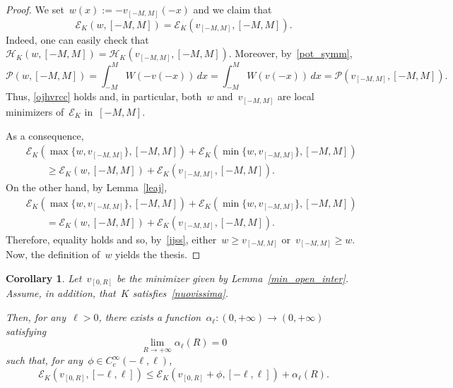 \documentclass[10pt,a4paper]{amsart}
\newtheorem{corol}[theorem]{Corollary}
\numberwithin{equation}{section}
\newcommand{\Ec}{\mathcal{E}_K}
\newcommand{\Hc}{\mathcal{H}_K}
\newcommand{\Pc}{\mathcal{P}}
\begin{document}
\begin{proof}
We set~$w(x):=-v_{[-M,M]}(-x)$ and we claim that
\begin{equation}\label{ojhvrcc}
\Ec(w,[-M,M]) = \Ec(v_{[-M,M]},[-M,M]).
\end{equation}
Indeed, one can easily check that~$\Hc(w,[-M,M])=\Hc(v_{[-M,M]},[-M,M])$.
Moreover, by~\eqref{pot_symm},
\begin{equation*}
\Pc(w,[-M,M])= \int_{-M}^{M} W(-v(-x))\, dx =\int_{-M}^{M} W(v(-x))\, dx =\Pc(v_{[-M,M]},[-M,M]).
\end{equation*}
Thus, \eqref{ojhvrcc} holds and, in particular, both~$w$ and~$v_{[-M,M]}$ are local minimizers of~$\Ec$ in~$[-M,M]$.

As a consequence,
\begin{eqnarray*}&&
\Ec(\max\{w,v_{[-M,M]}\},[-M,M])+\Ec(\min\{w,v_{[-M,M]}\},[-M,M])\\&&\qquad \geq \Ec(w,[-M,M]) +\Ec(v_{[-M,M]},[-M,M]).
\end{eqnarray*}
On the other hand, by Lemma~\ref{leaj},
\begin{eqnarray*}&&
\Ec(\max\{w,v_{[-M,M]}\},[-M,M])+\Ec(\min\{w,v_{[-M,M]}\},[-M,M]) \\&&\qquad= \Ec(w,[-M,M]) +\Ec(v_{[-M,M]},[-M,M]).
\end{eqnarray*}
Therefore, equality holds and so, by~\eqref{jjss},
either~$w \geq v_{[-M,M]}$ or~$v_{[-M,M]}\ge w$. Now, the definition of~$w$ yields the thesis.
\end{proof}

\begin{corol}\label{alm_min}
Let~$v_{[0,R]}$ be the minimizer given by
Lemma~\ref{min_open_inter}.
Assume, in addition, that~$K$ satisfies~\eqref{nuovissima}.

Then, for any~$\ell>0$, there exists a function~$\alpha_{\ell}: (0,+\infty) \to (0,+\infty)$ satisfying
\begin{equation}\label{gfhdjskyrueityrueigfhdjs0}
\lim_{R \to +\infty} \alpha_{\ell}(R)=0\end{equation} such that,
for any~$\phi \in C_c^{\infty}(-\ell,\ell)$,
\begin{equation}\label{gfhdjskyrueityrueigfhdjs}
\Ec(v_{[0,R]}, [-\ell, \ell]) \leq \Ec(v_{[0,R]}+\phi, [-\ell,\ell])+ \alpha_{\ell}(R).
\end{equation}
\end{corol}
\end{document}
